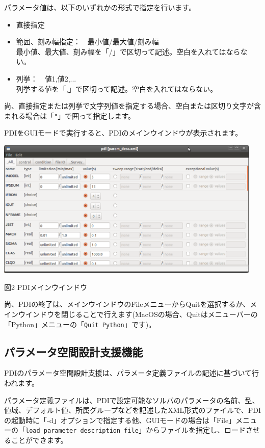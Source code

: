 \documentclass[a4paper,11pt]{jarticle}
\begin{document}
\begin{description}
\begin{description}
パラメータ値は、以下のいずれかの形式で指定を行います。
\begin{itemize}
\item 直接指定
\item 範囲、刻み幅指定：　最小値/最大値/刻み幅\\
最小値、最大値、刻み幅を「/」で区切って記述。空白を入れてはならない。
\item 列挙：　値1,値2,...\\
列挙する値を「,」で区切って記述。空白を入れてはならない。
\end{itemize}

尚、直接指定または列挙で文字列値を指定する場合、空白または区切り文字が含まれる場合は「{\tt "}」で囲って指定します。

\end{description}
\end{description}

PDIをGUIモードで実行すると、PDIのメインウインドウが表示されます。

\begin{center}
\includegraphics[width=360pt, bb=0 0 982 512]{figs/fig001.png}

図2 PDIメインウインドウ
\end{center}


尚、PDIの終了は、メインウインドウのFileメニューからQuitを選択するか、メインウインドウを閉じることで行えます(MacOSの場合、Quitはメニューバーの「Python」メニューの「{\tt Quit Python}」です)。


\subsection{パラメータ空間設計支援機能}

PDIのパラメータ空間設計支援は、パラメータ定義ファイルの記述に基づいて行われます。

パラメータ定義ファイルは、PDIで設定可能なソルバのパラメータの名前、型、値域、デフォルト値、所属グループなどを記述したXML形式のファイルで、PDIの起動時に「-d」オプションで指定する他、GUIモードの場合は「File」メニューの「{\tt load parameter description file}」からファイルを指定し、ロードさせることができます。
\end{document}
